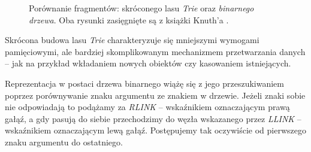 \begin{figure}
\begin{subfigure}{0.35\textwidth}
			\label{fig:BinarneDrzewoTrie}
		\end{subfigure}
		\caption{Porównanie fragmentów: \protect{} skróconego lasu \emph{Trie} oraz \protect{} \emph{binarnego drzewa}. Oba rysunki zasięgnięte są z książki Knuth'a \cite{KnuthsTheArtOfComputerProgramming3}.}
	\end{figure}
	
	Skrócona budowa lasu \emph{Trie} charakteryzuje się mniejszymi wymogami pamięciowymi, ale bardziej skomplikowanym mechanizmem przetwarzania danych -- jak na przykład wkładaniem nowych obiektów czy kasowaniem istniejących.\newline
	
	Reprezentacja w postaci drzewa binarnego wiążę się z jego przeszukiwaniem poprzez porównywanie znaku argumentu ze znakiem w drzewie. Jeżeli znaki sobie nie odpowiadają to podążamy za \emph{RLINK} -- wskaźnikiem oznaczającym prawą gałąź, a gdy pasują do siebie przechodzimy do węzła wskazanego przez \emph{LLINK} -- wskaźnikiem oznaczającym lewą gałąź. Postępujemy tak oczywiście od pierwszego znaku argumentu do ostatniego. 
	
